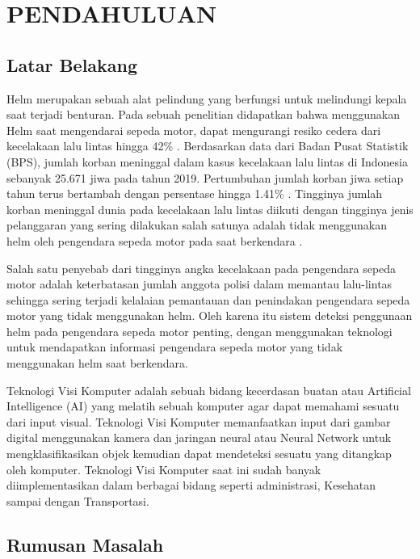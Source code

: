 \section{PENDAHULUAN}

\subsection{Latar Belakang}

Helm merupakan sebuah alat pelindung yang berfungsi untuk melindungi kepala saat
terjadi benturan. Pada sebuah penelitian didapatkan bahwa menggunakan Helm saat
mengendarai sepeda motor, dapat mengurangi resiko cedera dari kecelakaan lalu lintas
hingga 42\% \citep{helmetUse}. Berdasarkan data dari Badan Pusat Statistik (BPS), jumlah korban
meninggal dalam kasus kecelakaan lalu lintas di Indonesia sebanyak 25.671 jiwa pada
tahun 2019. Pertumbuhan jumlah korban jiwa setiap tahun terus bertambah dengan
persentase hingga 1.41\% \citep{transportasi2019}. Tingginya jumlah korban meninggal dunia pada kecelakaan
lalu lintas diikuti dengan tingginya jenis pelanggaran yang sering dilakukan salah satunya
adalah tidak menggunakan helm oleh pengendara sepeda motor pada saat berkendara \citep{kecelakaan}.

Salah satu penyebab dari tingginya angka kecelakaan pada pengendara sepeda motor adalah keterbatasan
jumlah anggota polisi dalam memantau lalu-lintas sehingga sering terjadi kelalaian pemantauan dan penindakan
pengendara sepeda motor yang tidak menggunakan helm. Oleh karena itu sistem deteksi penggunaan helm pada pengendara
sepeda motor penting, dengan menggunakan teknologi untuk mendapatkan informasi pengendara sepeda motor yang tidak 
menggunakan helm saat berkendara.

Teknologi Visi Komputer adalah sebuah bidang kecerdasan buatan atau Artificial
Intelligence (AI) yang melatih sebuah komputer agar dapat memahami sesuatu dari input
visual. Teknologi Visi Komputer memanfaatkan input dari gambar digital menggunakan
kamera dan jaringan neural atau Neural Network  untuk mengklasifikasikan objek
kemudian dapat mendeteksi sesuatu yang ditangkap oleh komputer. Teknologi Visi
Komputer saat ini sudah banyak diimplementasikan dalam berbagai bidang seperti
administrasi, Kesehatan sampai dengan Transportasi.

\subsection{Rumusan Masalah}

